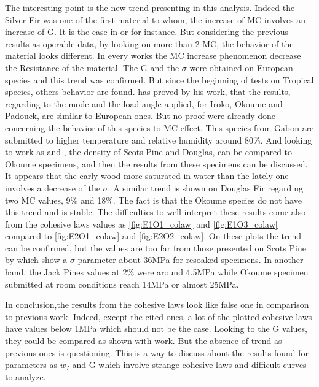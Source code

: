 The interesting point is the new trend presenting in this analysis. Indeed the Silver Fir was one of the first material to whom, the increase of MC involves an increase of G. It is the case in \parencite{Ang2017} or \parencite{Huang2020} for instance. But considering the previous results as operable data, by looking on more than 2 MC, the behavior of the material looks different. In every works the MC increase phenomenon decrease the Resistance of the material. The G and the $\sigma$ were obtained on European species and this trend was confirmed. But since the beginning of tests on Tropical species, others behavior are found. \parencite{Reference7} has proved by his work, that the results, regarding to the mode and the load angle applied, for Iroko, Okoume and Padouck, are similar to European ones. But no proof were already done concerning the behavior of this species to MC effect. This species from Gabon are submitted to higher temperature and relative humidity around 80\%. And looking to work as \parencite{Kif1998} and \parencite{Ang2017}, the density of Scots Pine and Douglas, can be compared to Okoume specimens, and then the results from these specimens can be discussed. It appears that the early wood more saturated in water than the lately one involves a decrease of the $\sigma$. A similar trend is shown on Douglas Fir regarding two MC values, 9\% and 18\%. The fact is that the Okoume species do not have this trend and is stable. The difficulties to well interpret these results come also from the cohesive laws values as \ref{fig:E1O1_colaw} and \ref{fig:E1O3_colaw} compared to \ref{fig:E2O1_colaw} and \ref{fig:E2O2_colaw}. On these plots the trend can be confirmed, but the values are too far from those presented on Scots Pine by \parencite{Huang2020} which show a $\sigma$ parameter about 36\si{\mega\pascal} for resoaked specimens. In another hand, the Jack Pines values at 2\% were around 4.5\si{\mega\pascal} while Okoume specimen submitted at room conditions reach 14\si{\mega\pascal} or almost 25\si{\mega\pascal}.

In conclusion,the results from the cohesive laws look like false one in comparison to previous work. Indeed, except the cited ones, a lot of the plotted cohesive laws have values below 1\si{\mega\pascal} which should not be the case. Looking to the G values, they could be compared as shown with \parencite{Ang2017} work. But the absence of trend as previous ones is questioning. This is a way to discuss about the results found for parameters as $w_{I}$ and G which involve strange cohesive laws and difficult curves to analyze.
